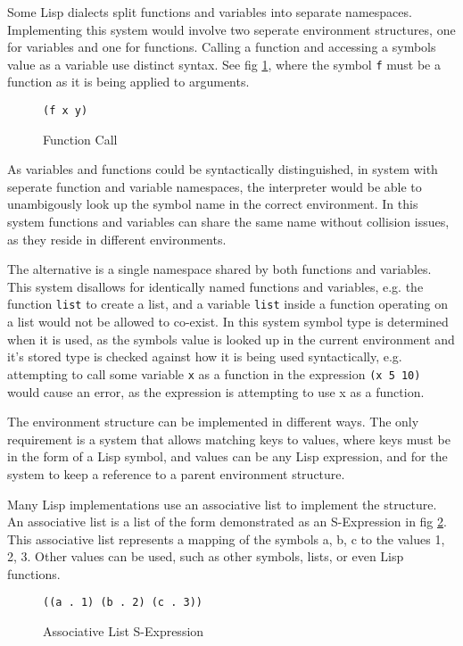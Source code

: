 \documentclass[10pt]{report}
\begin{document}
Some Lisp dialects split functions and variables into separate namespaces. Implementing this system would involve two seperate environment structures, one for variables and one for functions. Calling a function and accessing a symbols value as a variable use distinct syntax. See fig \ref{fig:funcall}, where the symbol \texttt{f} must be a function as it is being applied to arguments. 

\begin{figure}[hb]
  \centering
  \texttt{(f x y)}
  \caption{Function Call}
  \label{fig:funcall}
\end{figure}

As variables and functions could be syntactically distinguished, in system with seperate function and variable namespaces, the interpreter would be able to unambigously look up the symbol name in the correct environment. In this system functions and variables can share the same name without collision issues, as they reside in different environments.

The alternative is a single namespace shared by both functions and variables. This system disallows for identically named functions and variables, e.g. the function \texttt{list} to create a list, and a variable \texttt{list} inside a function operating on a list would not be allowed to co-exist. In this system symbol type is determined when it is used, as the symbols value is looked up in the current environment and it's stored type is checked against how it is being used syntactically, e.g. attempting to call some variable \texttt{x} as a function in the expression \texttt{(x 5 10)} would cause an error, as the expression is attempting to use x as a function.

The environment structure can be implemented in different ways. The only requirement is a system that allows matching keys to values, where keys must be in the form of a Lisp symbol, and values can be any Lisp expression, and for the system to keep a reference to a parent environment structure.

Many Lisp implementations use an associative list to implement the structure. An associative list is a list of the form demonstrated as an S-Expression in fig \ref{fig:alist}. This associative list represents a mapping of the symbols {a, b, c} to the values {1, 2, 3}. Other values can be used, such as other symbols, lists, or even Lisp functions. 

\begin{figure}[h]
  \centering
  \texttt{((a . 1) (b . 2) (c . 3))}
  \caption{Associative List S-Expression}
  \label{fig:alist}
\end{figure}
\end{document}
